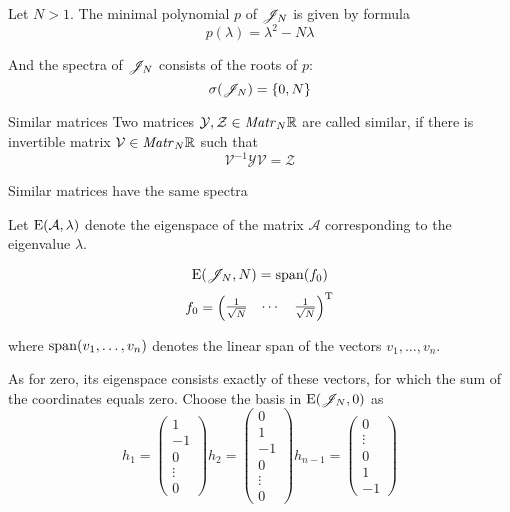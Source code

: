 \documentclass{article}
\begin{document}
\begin{propose}
    Let $N>1$.
    The minimal polynomial $p$ of $\mathscr{J}_{N}$ is given by formula
    $$p(\lambda) = \lambda^2 - N \lambda$$

    And the spectra of $\mathscr{J}_{N}$ consists of the roots of $p$:
    $$\sigma(\mathscr{J}_{N}) = \{ 0, N \}$$
\end{propose}

\begin{dfn}{Similar matrices}
    Two matrices $\mathcal Y, \mathcal Z \in\mathit{Matr}_{N} {\mathbb{R}}$ are called similar,
    if there is invertible matrix $\mathcal V\in\mathit{Matr}_{N} {\mathbb{R}}$ such that
    $$\mathcal V^{-1}\mathcal Y\mathcal V = \mathcal Z$$
\end{dfn}
\begin{propose}
    Similar matrices have the same spectra
\end{propose}

Let $\mathrm{E}({\mathcal A}, {\lambda})$ denote the eigenspace of the matrix $\mathcal A$
corresponding to the eigenvalue $\lambda$.

\begin{propose}
    $$\mathrm{E}({\mathscr{J}_{N}}, {N}) = \mathrm{span}({f_0})$$
    $$f_0 = \begin{pmatrix} \frac{1}{\sqrt N} & \cdots & \frac{1}{\sqrt N} \end{pmatrix}^{\mathrm{T}}$$

        where $\mathrm{span}({v_1, \ldots, v_n})$ denotes the linear span of the vectors $v_1, \ldots, v_n$.
\end{propose}

As for zero, its eigenspace consists exactly of these vectors,
for which the sum of the coordinates equals zero.
Choose the basis in $\mathrm{E}({\mathscr{J}_{N}}, {0})$ as
$$
h_1 = \begin{pmatrix}1 \\ -1 \\ 0 \\ \vdots \\ 0\end{pmatrix}
    h_2 = \begin{pmatrix}0 \\ 1 \\ -1 \\ 0 \\ \vdots \\ 0\end{pmatrix}
        h_{n-1} = \begin{pmatrix}0 \\ \vdots \\ 0 \\ 1 \\ -1 \end{pmatrix}$$
\end{document}
